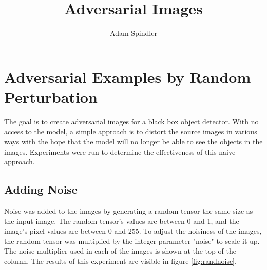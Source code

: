 \documentclass{article}
\title{Adversarial Images}
\author{Adam Spindler}
\begin{document}
\maketitle

\section{Adversarial Examples by Random Perturbation}

The goal is to create adversarial images for a black box object detector. With no access to the model, a simple approach is to distort the source images in various ways with the hope that the model will no longer be able to see the objects in the images. Experiments were run to determine the effectiveness of this naive approach.

\subsection{Adding Noise}
Noise was added to the images by generating a random tensor the same size as the input image. The random tensor's values are between 0 and 1, and the image's pixel values are between 0 and 255. To adjust the noisiness of the images, the random tensor was multiplied by the integer parameter "noise" to scale it up. The noise multiplier used in each of the images is shown at the top of the column. The results of this experiment are visible in figure \ref{fig:randnoise}.
\end{document}
